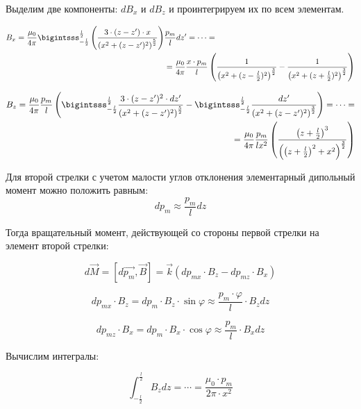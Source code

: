 \documentclass{letask}
\begin{document}
Выделим две компоненты: $dB_x$ и $dB_z$ и проинтегрируем их по всем элементам. 

\begin{equation}
\begin{split}
B_x = \dfrac{\mu_0}{4 \pi} \bigintsss_{-\frac{l}{2}}^{\frac{l}{2}}
	\left(
		\dfrac{3 \cdot (z-z') \cdot x}
		{\left(x^2 + (z-z')^2 \right)^{\frac{5}{2}}}
	\right)&
	\dfrac{p_m}{l} dz' =
	\cdots = \\
	& = \dfrac{\mu_0}{4 \pi}
	\dfrac{x \cdot p_m}{l}
	\left(
		\dfrac{1}{\left(x^2 + (z-\frac{l}{2})^2 \right)^{\frac{3}{2}}} - 
		\dfrac{1}{\left(x^2 + (z+\frac{l}{2})^2 \right)^{\frac{3}{2}}} 
	\right)
\end{split}
\end{equation}

\begin{equation}
\begin{split}
B_z = \dfrac{\mu_0}{4 \pi} \dfrac{p_m}{l}
\left(
	\bigintsss_{-\frac{l}{2}}^{\frac{l}{2}}
	\dfrac{3 \cdot (z-z')^2 \cdot dz'}
	{\left(x^2 + (z-z')^2 \right)^{\frac{5}{2}}} - 
	 \bigintsss_{-\frac{l}{2}}^{\frac{l}{2}}
	\dfrac{dz'} 
	{\left(x^2 + (z-z')^2 \right)^{\frac{3}{2}}}
\right) =
	\cdots = \\ 
	  = \dfrac{\mu_0}{4 \pi} \dfrac{p_m}{lx^2}
\left(
	\dfrac{\left(z+\frac{l}{2}\right)^3}
	{\left(\left(z+\frac{l}{2}\right)^2 + x^2 \right)^{\frac{3}{2}}}
\right)
\end{split}
\end{equation}

Для второй стрелки с учетом малости углов отклонения элементарный дипольный момент можно положить равным:
$$dp_m \approx \dfrac{p_m}{l} dz$$

Тогда вращательный момент, действующей со стороны первой стрелки на элемент второй стрелки:

\begin{equation}
d \vec{M} = \left[ d \vec{p_m} , \vec{B}  \right] = \vec{k} (dp_{mx} \cdot B_z - dp_{mz} \cdot B_x)
\end{equation}

$$dp_{mx} \cdot B_z = dp_m \cdot B_z \cdot \sin \varphi \approx \dfrac{p_m \cdot \varphi}{l} \cdot B_z dz$$

$$dp_{mz} \cdot B_x = dp_m \cdot B_x \cdot \cos \varphi \approx \dfrac{p_m}{l} \cdot B_x dz$$

Вычислим интегралы:

\begin{equation}
\int_{-\frac{l}{2}}^{\frac{l}{2}} B_z dz = \cdots = \dfrac{\mu_0 \cdot p_m}{2 \pi \cdot x^2}
\end{equation}
\end{document}

